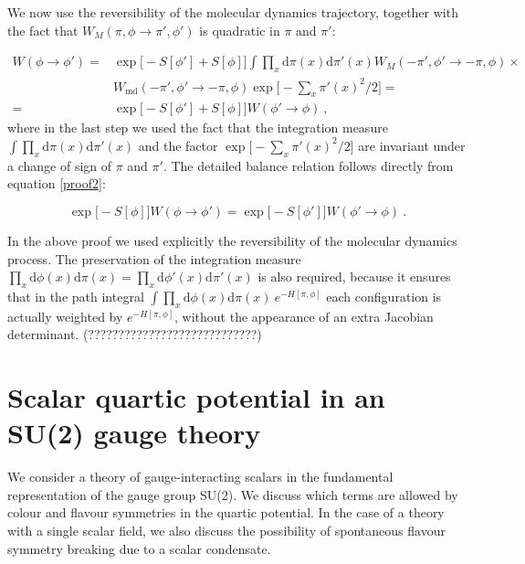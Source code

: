 We now use the  reversibility of the molecular dynamics trajectory, together with the fact that $W_M(\pi,\phi \to \pi',\phi')$ is quadratic in $\pi$ and $\pi'$:

\begin{equation}
\begin{split}
W(\phi \to \phi') = & \exp \bigl[ - S[\phi'] + S[\phi] \bigr] \int \prod_{x} \mathrm{d} \pi(x) \mathrm{d} \pi'(x) W_M(-\pi',\phi' \to -\pi,\phi) \times \\
& W_{\mathrm{md}}(-\pi',\phi' \to -\pi,\phi) \exp \bigl[ -\sum_x \pi'(x)^2 /2 \bigr] = \\
= &  \exp \bigl[ - S[\phi'] + S[\phi] \bigr] W(\phi' \to \phi) \: ,
\end{split}
\label{proof2}
\end{equation}
%
where in the last step we used the fact that the integration measure $ \int \prod_{x} \mathrm{d} \pi(x) \mathrm{d} \pi'(x)$ and the factor $\exp \bigl[ -\sum_x \pi'(x)^2 /2 \bigr]$ are invariant under a change of sign of $\pi$ and $\pi'$. The detailed balance relation follows directly from equation \ref{proof2}:

\begin{equation}
\exp \bigl[ -  S[\phi] \bigr]W(\phi \to \phi') =\exp \bigl[ - S[\phi'] \bigr] W(\phi' \to \phi) \: .
\end{equation}

In the above proof we used explicitly the reversibility of the molecular dynamics process. The preservation of the integration measure $ \prod_{x} \mathrm{d} \phi(x) \mathrm{d} \pi(x) =  \prod_{x} \mathrm{d} \phi'(x) \mathrm{d} \pi'(x)$ is also required, because it ensures that in the path integral  $\int \prod_{x} \mathrm{d} \phi(x) \mathrm{d} \pi(x) \: e^{-H[\pi,\phi]}$ each configuration is actually weighted by $e^{-H[\pi,\phi]}$, without the appearance of an extra Jacobian determinant. (????????????????????????????)


\section{Scalar quartic potential in an SU(2) gauge theory}
\label{app_quartic_potential}

We consider a theory of gauge-interacting scalars in the fundamental representation of the gauge group SU(2). We discuss which terms are allowed by colour and flavour symmetries in the quartic potential. In the case of a theory with a single scalar field, we also discuss the possibility of spontaneous flavour symmetry breaking due to a scalar condensate.

